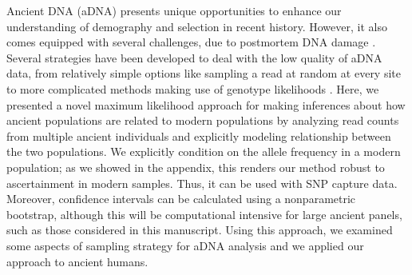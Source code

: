\documentclass[11pt, oneside]{article}   	%
\begin{document}
Ancient DNA (aDNA) presents unique opportunities to enhance our understanding of demography and selection in recent history. However, it also comes equipped with several challenges, due to postmortem DNA damage \citep{sawyer2012temporal}. Several strategies have been developed to deal with the low quality of aDNA data, from relatively simple options like sampling a read at random at every site \citep{green2010draft} to more complicated methods making use of genotype likelihoods \citep{racimo2016joint}. Here, we presented a novel maximum likelihood approach for making inferences about how ancient populations are related to modern populations by analyzing read counts from multiple ancient individuals and explicitly modeling relationship between the two populations. We explicitly condition on the allele frequency in a modern population; as we showed in the appendix, this renders our method robust to ascertainment in modern samples. Thus, it can be used with SNP capture data. Moreover, confidence intervals can be calculated using a nonparametric bootstrap, although this will be computational intensive for large ancient panels, such as those considered in this manuscript. Using this approach, we examined some aspects of sampling strategy for aDNA analysis and we applied our approach to ancient humans.
\end{document}
